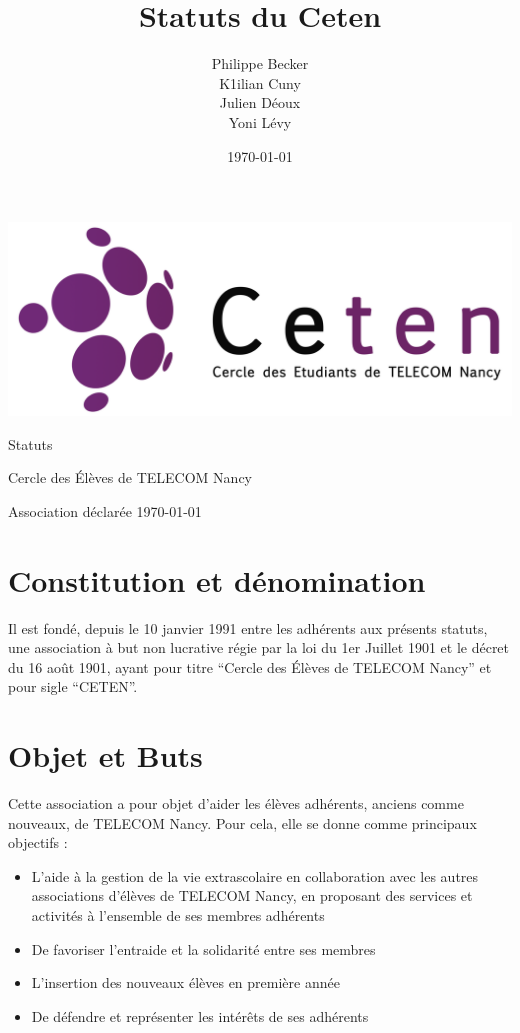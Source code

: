 \documentclass{article} %
\title{Statuts du Ceten}
\author{Philippe Becker\\
	K1ilian Cuny\\
	Julien Déoux\\
	Yoni Lévy}
\date\today
\begin{document}

	
	\begin{titlepage}
		\begin{center}
			\includegraphics[width=\textwidth]{images/ceten.png}\par
			\vspace{3cm}
			{\Huge \light Statuts}\par
			\vfill
			{\large Cercle des Élèves de TELECOM Nancy}\par
			{\large \light Association déclarée}
			\vfill
			{\light \today}\par
		\end{center}
	\end{titlepage}

	\section{Constitution et dénomination}
		Il est fondé, depuis le 10 janvier 1991 entre les adhérents aux présents statuts,
		une association à but non lucrative régie par la loi du 1er Juillet 1901 et le
		décret du 16 août 1901, ayant pour titre “Cercle des Élèves de TELECOM Nancy” et pour sigle “CETEN”.

	\section{Objet et Buts}
		Cette association a pour objet d’aider les élèves adhérents, anciens comme nouveaux, de TELECOM Nancy. 
		Pour cela, elle se donne comme principaux objectifs :
		\begin{itemize}
			\item L’aide à la gestion de la vie extrascolaire en collaboration avec les autres associations
				d'élèves de TELECOM Nancy, en proposant des services et activités à l’ensemble de ses
				membres adhérents
			\item De favoriser l’entraide et la solidarité entre ses membres
			\item L’insertion des nouveaux élèves en première année
			\item De défendre et représenter les intérêts de ses adhérents
		\end{itemize}
\end{document}
